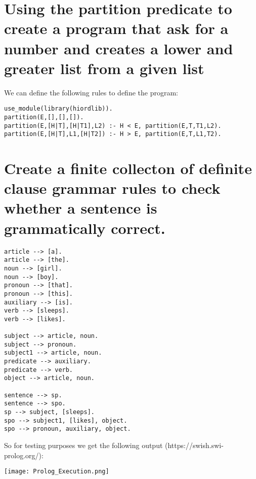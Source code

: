 \documentclass{report}
\begin{document}
	\section{Using the partition predicate to create a program that ask for a number and creates a lower and greater list from a given list}
	\startsection
	We can define the following rules to define the program:
		\begin{verbatim}
use_module(library(hiordlib)).
partition(E,[],[],[]).
partition(E,[H|T],[H|T1],L2) :- H < E, partition(E,T,T1,L2).
partition(E,[H|T],L1,[H|T2]) :- H > E, partition(E,T,L1,T2).
		\end{verbatim}
	\closesection
	
	\section{Create a finite collecton of definite clause grammar rules to check whether a sentence is grammatically correct.}
	\startsection
		\begin{verbatim}
article --> [a].
article --> [the].
noun --> [girl].
noun --> [boy].
pronoun --> [that].
pronoun --> [this].
auxiliary --> [is].
verb --> [sleeps].
verb --> [likes].

subject --> article, noun.
subject --> pronoun.
subject1 --> article, noun.
predicate --> auxiliary.
predicate --> verb.
object --> article, noun.

sentence --> sp.
sentence --> spo.
sp --> subject, [sleeps].
spo --> subject1, [likes], object.
spo --> pronoun, auxiliary, object.
		\end{verbatim}
		So for testing purposes we get the following output (https://swish.swi-prolog.org/):
		\begin{center}
			\texttt{[image: Prolog\_Execution.png]}
		\end{center}
	\closesection
\end{document}
